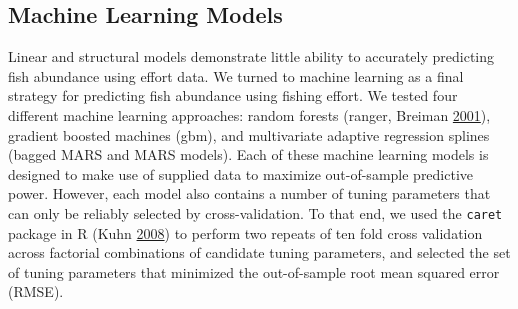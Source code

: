 \documentclass[twoside,12pt,final]{ucthesis-CA2012}
\begin{document}
\begin{ucmainmatter}
\subsection{Machine Learning Models}\label{machine-learning-models}

Linear and structural models demonstrate little ability to accurately
predicting fish abundance using effort data. We turned to machine
learning as a final strategy for predicting fish abundance using fishing
effort. We tested four different machine learning approaches: random
forests (ranger, Breiman \protect\hyperlink{ref-Breiman2001}{2001}),
gradient boosted machines (gbm), and multivariate adaptive regression
splines (bagged MARS and MARS models). Each of these machine learning
models is designed to make use of supplied data to maximize
out-of-sample predictive power. However, each model also contains a
number of tuning parameters that can only be reliably selected by
cross-validation. To that end, we used the \texttt{caret} package in R
(Kuhn \protect\hyperlink{ref-Kuhn2008}{2008}) to perform two repeats of
ten fold cross validation across factorial combinations of candidate
tuning parameters, and selected the set of tuning parameters that
minimized the out-of-sample root mean squared error (RMSE).


\end{ucmainmatter}
\end{document}
